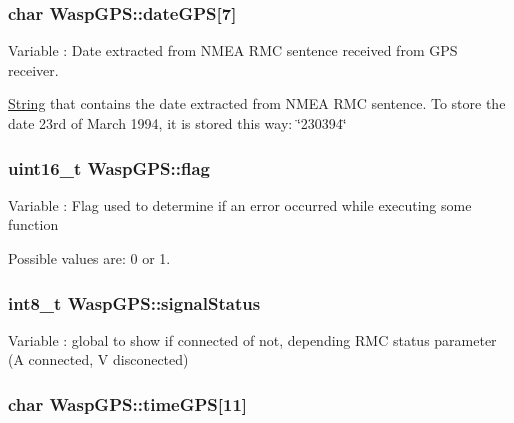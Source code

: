 \subsubsection[{\texorpdfstring{date\+G\+PS}{dateGPS}}]{\setlength{\rightskip}{0pt plus 5cm}char Wasp\+G\+P\+S\+::date\+G\+PS\mbox{[}7\mbox{]}}\hypertarget{class_wasp_g_p_s_a559035395a1af4c42e3b8ec4f8fc9650}{}\label{class_wasp_g_p_s_a559035395a1af4c42e3b8ec4f8fc9650}


Variable \+: Date extracted from N\+M\+EA R\+MC sentence received from G\+PS receiver. 

\hyperlink{class_string}{String} that contains the date extracted from N\+M\+EA R\+MC sentence. To store the date 23rd of March 1994, it is stored this way\+: \char`\"{}230394\char`\"{} 
\subsubsection[{\texorpdfstring{flag}{flag}}]{\setlength{\rightskip}{0pt plus 5cm}uint16\+\_\+t Wasp\+G\+P\+S\+::flag}\hypertarget{class_wasp_g_p_s_a626c22eceec7e3c24c617deb83b4ec88}{}\label{class_wasp_g_p_s_a626c22eceec7e3c24c617deb83b4ec88}
Variable \+: Flag used to determine if an error occurred while executing some function

Possible values are\+: 0 or 1. 
\subsubsection[{\texorpdfstring{signal\+Status}{signalStatus}}]{\setlength{\rightskip}{0pt plus 5cm}int8\+\_\+t Wasp\+G\+P\+S\+::signal\+Status}\hypertarget{class_wasp_g_p_s_af9e9791df9f98a8b48568c658d06c621}{}\label{class_wasp_g_p_s_af9e9791df9f98a8b48568c658d06c621}
Variable \+: global to show if connected of not, depending R\+MC status parameter (A connected, V disconected) 
\subsubsection[{\texorpdfstring{time\+G\+PS}{timeGPS}}]{\setlength{\rightskip}{0pt plus 5cm}char Wasp\+G\+P\+S\+::time\+G\+PS\mbox{[}11\mbox{]}}\hypertarget{class_wasp_g_p_s_a168dcfbebb54ee62c3cc02c2d84930f3}{}\label{class_wasp_g_p_s_a168dcfbebb54ee62c3cc02c2d84930f3}


